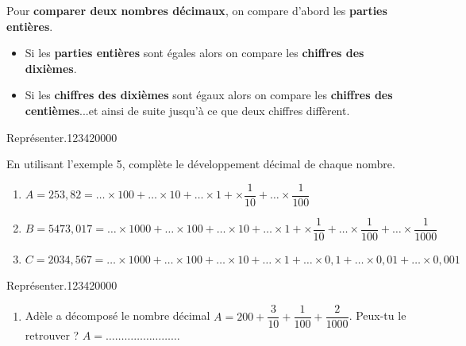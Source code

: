 \begin{pageCours}
\begin{Mt}
Pour \textbf{comparer deux nombres décimaux}, on compare d'abord les \textbf{parties entières}.
\begin{itemize}[leftmargin=*]
\item Si les \textbf{parties entières} sont égales alors on compare les \textbf{chiffres des dixièmes}.
\item Si les \textbf{chiffres des dixièmes} sont égaux alors on compare les \textbf{chiffres des centièmes}...et ainsi de suite jusqu'à ce que deux chiffres diffèrent.
\end{itemize}
\end{Mt}


\end{pageCours} 

\begin{pageAD} 



\begin{ExoCad}{Représenter.}{1234}{2}{0}{0}{0}{0}
 

En utilisant l'exemple 5, complète le développement décimal de chaque nombre.
\begin{enumerate}

\item $A = 253,82 = \ldots \times 100 + \ldots \times 10 + \ldots  \times 1 +  \times\dfrac{1}{10} + \ldots \times\dfrac{1}{100} $

\item $B = 5473,017 = \ldots \times 1000 + \ldots \times 100 + \ldots \times 10 + \ldots  \times 1 +  \times\dfrac{1}{10} + \ldots \times\dfrac{1}{100}+ \ldots \times\dfrac{1}{1000} $ \vspace{0.2cm}


\item $C = 2034,567 = \ldots \times 1000 + \ldots \times 100 + \ldots \times 10 + \ldots  \times 1 +  \ldots \times 0,1 + \ldots \times 0,01+ \ldots \times 0,001 $
\end{enumerate}
\end{ExoCad}

\begin{ExoCad}{Représenter.}{1234}{2}{0}{0}{0}{0}
 

\begin{enumerate}

\item Adèle a décomposé le nombre décimal  $A = 200 + \dfrac{3}{10} + \dfrac{1}{100} +  \dfrac{2}{1000} $. Peux-tu le retrouver ?
$A= \ldots\ldots\ldots\ldots\ldots\ldots\ldots\ldots $


\end{enumerate}
\end{ExoCad}
\end{pageAD}

